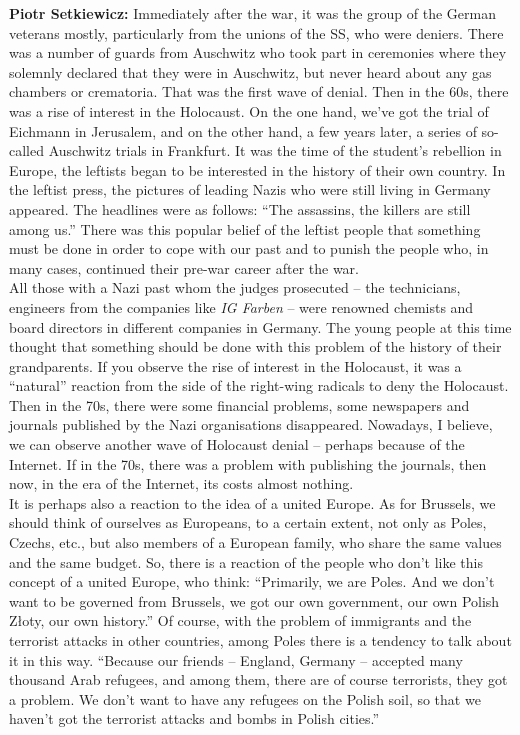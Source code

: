 \textbf{Piotr Setkiewicz:} Immediately after the war, it was the group of the German veterans mostly, particularly from the unions of the SS, who were deniers. There was a number of guards from Auschwitz who took part in ceremonies where they solemnly declared that they were in Auschwitz, but never heard about any gas chambers or crematoria. That was the first wave of denial. Then in the 60s, there was a rise of interest in the Holocaust. On the one hand, we've got the trial of Eichmann in Jerusalem, and on the other hand, a few years later, a series of so-called Auschwitz trials in Frankfurt. It was the time of the student’s rebellion in Europe, the leftists began to be interested in the history of their own country. In the leftist press, the pictures of leading Nazis who were still living in Germany appeared. The headlines were as follows: ``The assassins, the killers are still among us.'' There was this popular belief of the leftist people that something must be done in order to cope with our past and to punish the people who, in many cases, continued their pre-war career after the war.\\ 
All those with a Nazi past whom the judges prosecuted – the technicians, engineers from the companies like \textit{IG Farben} – were renowned chemists and board directors in different companies in Germany. The young people at this time thought that something should be done with this problem of the history of their grandparents. If you observe the rise of interest in the Holocaust, it was a ``natural'' reaction from the side of the right-wing radicals to deny the Holocaust.\\
Then in the 70s, there were some financial problems, some newspapers and journals published by the Nazi organisations disappeared. Nowadays, I believe, we can observe another wave of Holocaust denial – perhaps because of the Internet. If in the 70s, there was a problem with publishing the journals, then now, in the era of the Internet, its costs almost nothing.\\ 
\sloppy
It is perhaps also a reaction to the idea of a united Europe. As for Brussels, we should think of ourselves as Europeans, to a certain extent, not only as Poles, Czechs, etc., but also members of a European family, who share the same values and the same budget. So, there is a reaction of the people who don’t like this concept of a united Europe, who think: ``Primarily, we are Poles. And we don’t want to be governed from Brussels, we got our own government, our own Polish Złoty, our own history.'' Of course, with the problem of immigrants and the terrorist attacks in other countries, among Poles there is a tendency to talk about it in this way. ``Because our friends – England, Germany – accepted many thousand Arab refugees, and among them, there are of course terrorists, they got a problem. We don’t want to have any refugees on the Polish soil, so that we haven’t got the terrorist attacks and bombs in Polish cities.''

